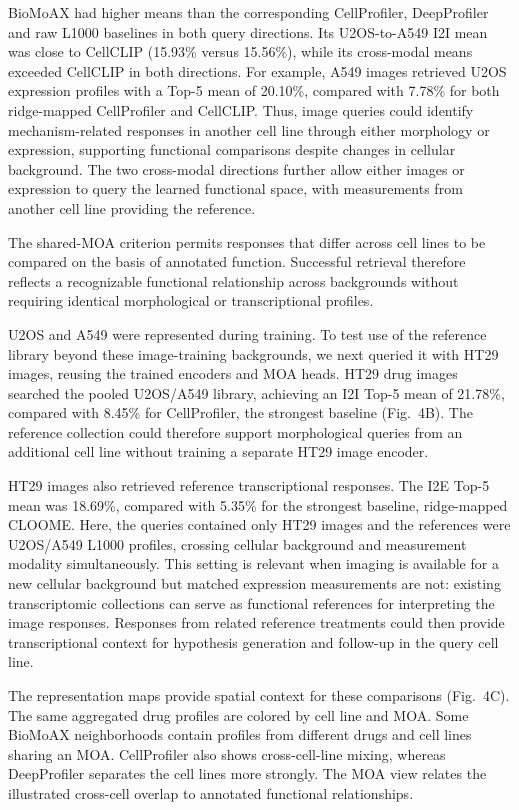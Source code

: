 
BioMoAX had higher means than the corresponding CellProfiler, DeepProfiler and raw L1000 baselines in both query directions. Its U2OS-to-A549 I2I mean was close to CellCLIP (15.93\% versus 15.56\%), while its cross-modal means exceeded CellCLIP in both directions. For example, A549 images retrieved U2OS expression profiles with a Top-5 mean of 20.10\%, compared with 7.78\% for both ridge-mapped CellProfiler and CellCLIP. Thus, image queries could identify mechanism-related responses in another cell line through either morphology or expression, supporting functional comparisons despite changes in cellular background. The two cross-modal directions further allow either images or expression to query the learned functional space, with measurements from another cell line providing the reference.

The shared-MOA criterion permits responses that differ across cell lines to be compared on the basis of annotated function. Successful retrieval therefore reflects a recognizable functional relationship across backgrounds without requiring identical morphological or transcriptional profiles.

U2OS and A549 were represented during training. To test use of the reference library beyond these image-training backgrounds, we next queried it with HT29 images, reusing the trained encoders and MOA heads. HT29 drug images searched the pooled U2OS/A549 library, achieving an I2I Top-5 mean of 21.78\%, compared with 8.45\% for CellProfiler, the strongest baseline (Fig.~4B). The reference collection could therefore support morphological queries from an additional cell line without training a separate HT29 image encoder.

HT29 images also retrieved reference transcriptional responses. The I2E Top-5 mean was 18.69\%, compared with 5.35\% for the strongest baseline, ridge-mapped CLOOME. Here, the queries contained only HT29 images and the references were U2OS/A549 L1000 profiles, crossing cellular background and measurement modality simultaneously. This setting is relevant when imaging is available for a new cellular background but matched expression measurements are not: existing transcriptomic collections can serve as functional references for interpreting the image responses. Responses from related reference treatments could then provide transcriptional context for hypothesis generation and follow-up in the query cell line.

The representation maps provide spatial context for these comparisons (Fig.~4C). The same aggregated drug profiles are colored by cell line and MOA. Some BioMoAX neighborhoods contain profiles from different drugs and cell lines sharing an MOA. CellProfiler also shows cross-cell-line mixing, whereas DeepProfiler separates the cell lines more strongly. The MOA view relates the illustrated cross-cell overlap to annotated functional relationships.

